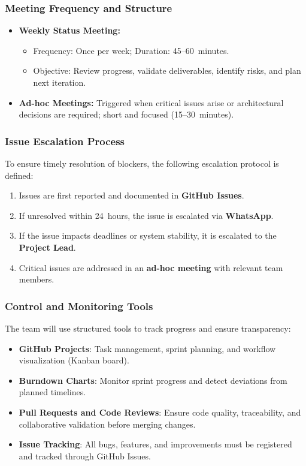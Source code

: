 \documentclass[9pt,conference]{IEEEtran}
\begin{document}
\subsubsection{Meeting Frequency and Structure}

\begin{itemize}
    \item \textbf{Weekly Status Meeting:}
        \begin{itemize}
            \item Frequency: Once per week; Duration: 45–60~minutes.
            \item Objective: Review progress, validate deliverables, identify risks, and plan next iteration.
        \end{itemize}
    \item \textbf{Ad-hoc Meetings:} Triggered when critical issues arise or architectural decisions are required; short and focused (15–30~minutes).
\end{itemize}

\subsubsection{Issue Escalation Process}

To ensure timely resolution of blockers, the following escalation protocol is defined:
\begin{enumerate}
    \item Issues are first reported and documented in \textbf{GitHub Issues}.
    \item If unresolved within 24~hours, the issue is escalated via \textbf{WhatsApp}.
    \item If the issue impacts deadlines or system stability, it is escalated to the \textbf{Project Lead}.
    \item Critical issues are addressed in an \textbf{ad-hoc meeting} with relevant team members.
\end{enumerate}

\subsubsection{Control and Monitoring Tools}

The team will use structured tools to track progress and ensure transparency:
\begin{itemize}
    \item \textbf{GitHub Projects}: Task management, sprint planning, and workflow visualization (Kanban board).
    \item \textbf{Burndown Charts}: Monitor sprint progress and detect deviations from planned timelines.
    \item \textbf{Pull Requests and Code Reviews}: Ensure code quality, traceability, and collaborative validation before merging changes.
    \item \textbf{Issue Tracking}: All bugs, features, and improvements must be registered and tracked through GitHub Issues.
\end{itemize}
\end{document}
